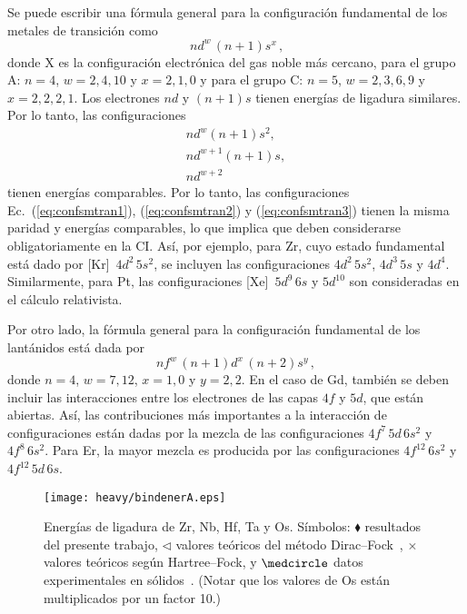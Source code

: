 Se puede escribir una fórmula general para la configuración fundamental 
de los metales de transición como
\begin{equation}
[\text{X}]\,nd^w\,(n+1)s^x\,,
\end{equation}
donde X es la configuración electrónica del gas noble más cercano, para 
el grupo A: $n=4$, $w=2,4,10$ y $x=2,1,0$ y para el grupo C: $n=5$, 
$w=2,3,6,9$ y $x=2,2,2,1$. Los electrones $nd$ y $(n+1)s$ tienen 
energías de ligadura similares. Por lo tanto, las configuraciones 
\begin{gather}
nd^w(n+1)s^2,
\label{eq:confsmtran1} \\
nd^{w+1}(n+1)s,
\label{eq:confsmtran2} \\
nd^{w+2}
\label{eq:confsmtran3}
\end{gather}
tienen energías comparables. Por lo tanto, las configuraciones 
Ec.~(\ref{eq:confsmtran1}), (\ref{eq:confsmtran2}) y 
(\ref{eq:confsmtran3}) tienen la misma paridad y energías comparables, 
lo que implica que deben considerarse obligatoriamente en la CI.
Así, por ejemplo, para Zr, cuyo estado fundamental está dado por 
[Kr]~$4d^2\,5s^2$, se incluyen las configuraciones $4d^2\,5s^2$, 
$4d^3\,5s$ y $4d^4$. Similarmente, para Pt, las configuraciones 
[Xe]~$5d^9\,6s$ y $5d^{10}$ son consideradas en el cálculo relativista.

Por otro lado, la fórmula general para la configuración fundamental de 
los lantánidos está dada por
\begin{equation}
nf^w\,(n+1)d^x\,(n+2)s^y\,,
\end{equation}
donde $n=4$, $w=7,12$, $x=1,0$ y $y=2,2$. En el caso de Gd, también 
se deben incluir las interacciones entre los electrones de las capas
$4f$ y $5d$, que están abiertas. Así, las contribuciones más 
importantes a la interacción de configuraciones están dadas por la 
mezcla de las configuraciones $4f^7\,5d\,6s^2$ y $4f^8\,6s^2$.
Para Er, la mayor mezcla es producida por las configuraciones 
$4f^{12}\,6s^2$ y $4f^{12}\,5d\,6s$.

\begin{figure}
\centering
\texttt{[image: heavy/bindenerA.eps]} 
\caption[Energías de ligadura de blancos pesados]
{Energías de ligadura de Zr, Nb, Hf, Ta y Os. Símbolos: 
$\blacklozenge$ resultados del presente trabajo, 
$\triangleleft$ valores teóricos del método 
Dirac--Fock~\cite{Desclaux:73}, $\times$ valores teóricos según 
Hartree--Fock, y $\medcircle$ datos experimentales en 
sólidos~\cite{Williams:95}. (Notar que los valores de Os están 
multiplicados por un factor 10.)}
\label{fig:bindenerA}
\end{figure}

